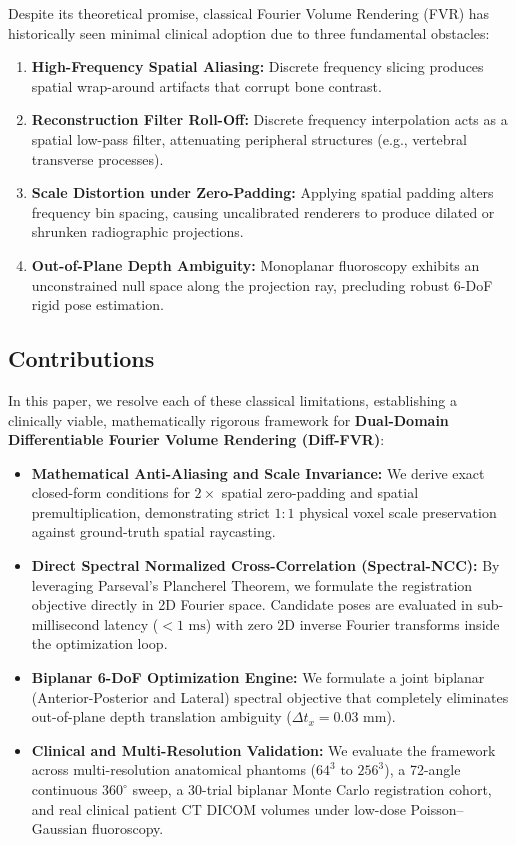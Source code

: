 \documentclass[journal,twocolumn]{IEEEtran}
\begin{document}
Despite its theoretical promise, classical Fourier Volume Rendering (FVR) has historically seen minimal clinical adoption due to three fundamental obstacles:
\begin{enumerate}
    \item \textbf{High-Frequency Spatial Aliasing:} Discrete frequency slicing produces spatial wrap-around artifacts that corrupt bone contrast.
    \item \textbf{Reconstruction Filter Roll-Off:} Discrete frequency interpolation acts as a spatial low-pass filter, attenuating peripheral structures (e.g., vertebral transverse processes).
    \item \textbf{Scale Distortion under Zero-Padding:} Applying spatial padding alters frequency bin spacing, causing uncalibrated renderers to produce dilated or shrunken radiographic projections.
    \item \textbf{Out-of-Plane Depth Ambiguity:} Monoplanar fluoroscopy exhibits an unconstrained null space along the projection ray, precluding robust 6-DoF rigid pose estimation.
\end{enumerate}

\subsection{Contributions}
In this paper, we resolve each of these classical limitations, establishing a clinically viable, mathematically rigorous framework for \textbf{Dual-Domain Differentiable Fourier Volume Rendering (Diff-FVR)}:
\begin{itemize}
    \item \textbf{Mathematical Anti-Aliasing and Scale Invariance:} We derive exact closed-form conditions for $2\times$ spatial zero-padding and spatial premultiplication, demonstrating strict $1:1$ physical voxel scale preservation against ground-truth spatial raycasting.
    \item \textbf{Direct Spectral Normalized Cross-Correlation (Spectral-NCC):} By leveraging Parseval's Plancherel Theorem, we formulate the registration objective directly in 2D Fourier space. Candidate poses are evaluated in sub-millisecond latency ($< 1\text{ ms}$) with zero 2D inverse Fourier transforms inside the optimization loop.
    \item \textbf{Biplanar 6-DoF Optimization Engine:} We formulate a joint biplanar (Anterior-Posterior and Lateral) spectral objective that completely eliminates out-of-plane depth translation ambiguity ($\Delta t_x = 0.03\text{ mm}$).
    \item \textbf{Clinical and Multi-Resolution Validation:} We evaluate the framework across multi-resolution anatomical phantoms ($64^3$ to $256^3$), a 72-angle continuous $360^\circ$ sweep, a 30-trial biplanar Monte Carlo registration cohort, and real clinical patient CT DICOM volumes under low-dose Poisson--Gaussian fluoroscopy.
\end{itemize}
\end{document}
